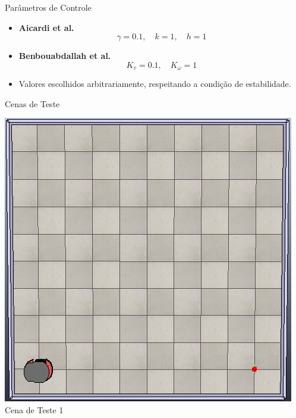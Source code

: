 \documentclass{beamer}
\begin{document}
\begin{frame}{Parâmetros de Controle}
  \begin{itemize}
    \item \textbf{Aicardi et al.}
    \[
    \gamma = 0.1, \quad k = 1, \quad h = 1
    \]
    \item \textbf{Benbouabdallah et al.}
    \[
    K_v = 0.1, \quad K_\omega = 1
    \]
    \item Valores escolhidos arbitrariamente, respeitando a condição de estabilidade.
  \end{itemize}
\end{frame}

\begin{frame}{Cenas de Teste}
\begin{minipage}{0.48\linewidth}
    \centering
    \includegraphics[width=\linewidth]{Figuras/Cena_teste_1.png}
   Cena de Teste 1
  \end{minipage}
  \hfill
  \begin{minipage}{0.48\linewidth}
    \centering

\end{minipage}
\end{frame}
\end{document}
